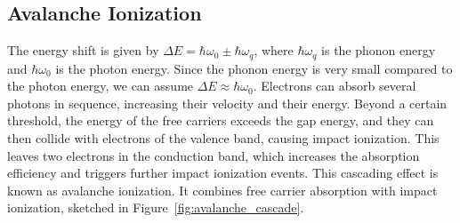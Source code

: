 \subsection{Avalanche Ionization}

The energy shift is given by $\Delta E = \hbar\omega_0 \pm \hbar\omega_q$, where $\hbar\omega_q$ is the phonon energy and $\hbar\omega_0$ is the photon energy. Since the phonon energy is very small compared to the photon energy, we can assume $\Delta E \approx \hbar\omega_0$. Electrons can absorb several photons in sequence, increasing their velocity and their energy. Beyond a certain threshold, the energy of the free carriers exceeds the gap energy, and they can then collide with electrons of the valence band, causing impact ionization. This leaves two electrons in the conduction band, which increases the absorption efficiency and triggers further impact ionization events. This cascading effect is known as avalanche ionization. It combines free carrier absorption with impact ionization, sketched in Figure~\ref{fig:avalanche_cascade}.

